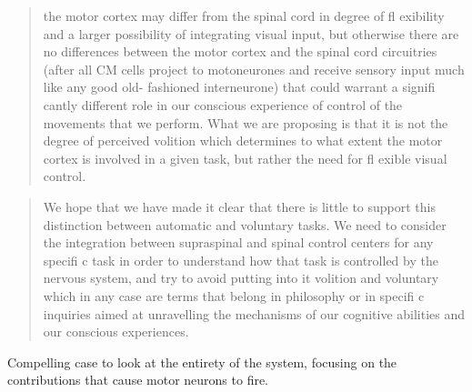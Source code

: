 \begin{quote}
the motor cortex may differ from the spinal cord in degree of fl
exibility and a larger possibility of integrating visual input, but
otherwise there are no differences between the motor cortex and the
spinal cord circuitries (after all CM cells project to motoneurones and
receive sensory input much like any good old- fashioned interneurone)
that could warrant a signifi cantly different role in our conscious
experience of control of the movements that we perform. What we are
proposing is that it is not the degree of perceived volition which
determines to what extent the motor cortex is involved in a given task,
but rather the need for fl exible visual control.
\end{quote}

\begin{quote}
We hope that we have made it clear that there is little to support this
distinction between automatic and voluntary tasks. We need to consider
the integration between supraspinal and spinal control centers for any
specifi c task in order to understand how that task is controlled by the
nervous system, and try to avoid putting into it volition and voluntary
which in any case are terms that belong in philosophy or in specifi c
inquiries aimed at unravelling the mechanisms of our cognitive abilities
and our conscious experiences.
\end{quote}

Compelling case to look at the entirety of the system, focusing on the
contributions that cause motor neurons to fire.
